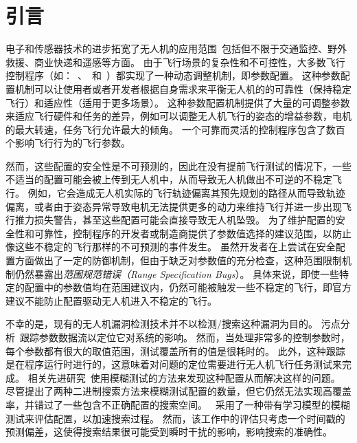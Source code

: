 \section{引言}
电子和传感器技术的进步拓宽了无人机的应用范围~\cite{bekmezci2013flying, bok2011context}包括但不限于交通监控、野外救援、商业快递和遥感等方面。
由于飞行场景的复杂性和不可控性，大多数飞行控制程序（如：~\cite{px4}、~\cite{Librepilot}和~\cite{ardupilot}）都实现了一种动态调整机制，即参数配置。
这种参数配置机制可以让使用者或者开发者根据自身需求来平衡无人机的的可靠性（保持稳定飞行）和适应性（适用于更多场景）。
这种参数配置机制提供了大量的可调整参数来适应飞行硬件和任务的差异，例如可以调整无人机飞行的姿态的增益参数，电机的最大转速，任务飞行允许最大的倾角。
一个可靠而灵活的控制程序包含了数百个影响飞行行为的飞行参数。

然而，这些配置的安全性是不可预测的，因此在没有提前飞行测试的情况下，一些不适当的配置可能会被上传到无人机中，从而导致无人机做出不可逆的不稳定飞行。
例如，它会造成无人机实际的飞行轨迹偏离其预先规划的路径从而导致轨迹偏离，或者由于姿态异常导致电机无法提供更多的动力来维持飞行并进一步出现飞行推力损失警告，甚至这些配置可能会直接导致无人机坠毁。
为了维护配置的安全性和可靠性，控制程序的开发者或制造商提供了参数值选择的建议范围，以防止像这些不稳定的飞行那样的不可预测的事件发生。
虽然开发者在上尝试在安全配置方面做出了一定的防御机制，但由于缺乏对参数值的充分检查，这种范围限制机制仍然暴露出\textit{范围规范错误（Range Specification Bugs}）。
具体来说，即使一些特定的配置中的参数值均在范围建议内，仍然可能被触发一些不稳定的飞行，即官方建议不能防止配置驱动无人机进入不稳定的飞行。

不幸的是，现有的无人机漏洞检测技术并不以检测/搜索这种漏洞为目的。
污点分析~\cite{cheng2018dtaint, she2020neutaint, chibotaru2019scalable, halin2019test}跟踪参数数据流以定位它对系统的影响。
然而，当处理非常多的控制参数时，每个参数都有很大的取值范围，测试覆盖所有的值是很耗时的。
此外，这种跟踪是在程序运行时进行的，这意味着对问题的定位需要进行无人机飞行任务测试来完成。
相关先进研究~\cite{rvfuzzer}使用模糊测试的方法来发现这种配置从而解决这样的问题。
尽管提出了两种二进制搜索方法来模糊测试配置的数量，但它仍然无法实现高覆盖率，并错过了一些包含不正确配置的搜索空间。
~\cite{han2022control}采用了一种带有学习模型的模糊测试来评估配置，以加速搜索过程。
然而，该工作中的评估只考虑一个时间戳的预测偏差，这使得搜索结果很可能受到瞬时干扰的影响，影响搜索的准确性。

